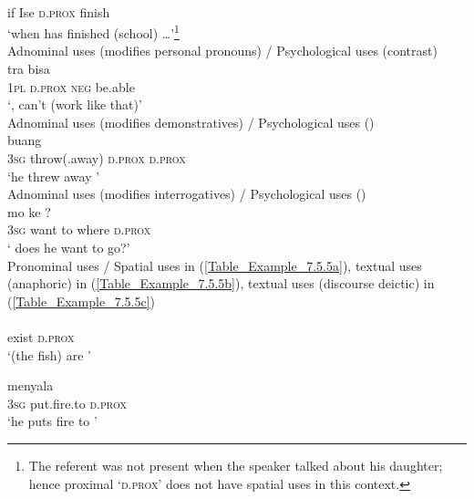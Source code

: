{\ex\label{Table_Example_7.5.1c}
    { } \\
 {if} {Ise} \textsc{d.prox} {finish}\\
\glt ‘when  has finished (school) \ldots’\footnote{The referent  was not present when the speaker talked about his daughter; hence proximal  ‘\textsc{d.prox}’ does not have spatial uses in this context.} \\
\z
\z
\ea
\label{Table_Example_7.5.2}
Adnominal uses (modifies personal pronouns) / Psychological uses (contrast)\\
\gll  {}  {tra} {bisa} \\
\textsc{1pl} \textsc{d.prox} \textsc{neg} be.able  \\
\glt  ‘, can’t (work like   that)’\\
\z
\ea\label{Table_Example_7.5.3}
Adnominal uses (modifies demonstratives) / Psychological uses ()\\
 {buang}    \\
 \textsc{3sg} throw(.away) \textsc{d.prox} \textsc{d.prox}  \\
\glt ‘he threw away ’\\
\z
\ea\label{Table_Example_7.5.4}
Adnominal uses (modifies interrogatives) / Psychological uses ()\\
 {mo} {ke}  ?\\
 \textsc{3sg} want to where \textsc{d.prox}  \\
\glt ‘\bluebold{)} does he want to go?’\\
\z
\ea\label{Table_Example_7.5.5}
Pronominal uses / Spatial uses in (\ref{Table_Example_7.5.5a}), textual uses (anaphoric) in (\ref{Table_Example_7.5.5b}), textual uses (discourse deictic) in (\ref{Table_Example_7.5.5c})\\
\ea\label{Table_Example_7.5.5a}
   \\
 exist \textsc{d.prox}  \\
\glt ‘(the fish) are ’\\
\vspace{5pt}

\ex\label{Table_Example_7.5.5b}
 {menyala}   \\
 \textsc{3sg} put.fire.to \textsc{d.prox}  \\
\glt ‘he puts fire to ’\\
\vspace{5pt}

}
